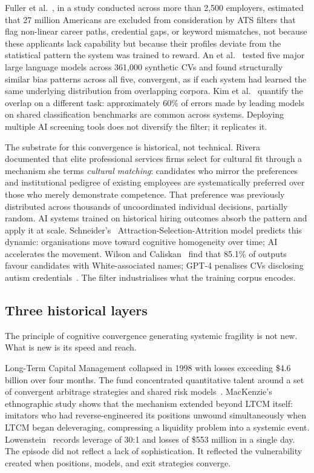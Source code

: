 \documentclass[11pt,a4paper]{article}
\begin{document}
Fuller et al.~\cite{fuller_hbs_2021}, in a study conducted across more than
2,500 employers, estimated that 27 million Americans are excluded from
consideration by ATS filters that flag non-linear career paths, credential
gaps, or keyword mismatches, not because these applicants lack capability
but because their profiles deviate from the statistical pattern the system
was trained to reward. An et al.~\cite{an_pnasnexus_2025} tested five major
large language models across 361,000 synthetic CVs and found structurally
similar bias patterns across all five, convergent, as if each system had
learned the same underlying distribution from overlapping corpora. Kim et
al.~\cite{kim_icml_2025} quantify the overlap on a different task:
approximately 60\% of errors made by leading models on shared classification
benchmarks are common across systems. Deploying multiple AI screening tools
does not diversify the filter; it replicates it.

The substrate for this convergence is historical, not technical.
Rivera~\cite{rivera_asr_2012} documented that elite professional services
firms select for cultural fit through a mechanism she terms \textit{cultural
matching}: candidates who mirror the preferences and institutional pedigree
of existing employees are systematically preferred over those who merely
demonstrate competence. That preference was previously distributed across
thousands of uncoordinated individual decisions, partially random. AI
systems trained on historical hiring outcomes absorb the pattern and apply it
at scale. Schneider's~\cite{schneider_pp_1987} Attraction-Selection-Attrition
model predicts this dynamic: organisations move toward cognitive homogeneity
over time; AI accelerates the movement. Wilson and
Caliskan~\cite{wilson_aies_2024} find that 85.1\% of outputs favour
candidates with White-associated names; GPT-4 penalises CVs disclosing autism
credentials~\cite{glazko_facct_2024}. The filter industrialises what the
training corpus encodes.

\subsection{Three historical layers}

The principle of cognitive convergence generating systemic fragility is not
new. What is new is its speed and reach.

Long-Term Capital Management collapsed in 1998 with losses exceeding \$4.6
billion over four months. The fund concentrated quantitative talent around a
set of convergent arbitrage strategies and shared risk
models~\cite{jorion_efm_2000,mackenzie_econsoc_2003}. MacKenzie's
ethnographic study shows that the mechanism extended beyond LTCM itself:
imitators who had reverse-engineered its positions unwound simultaneously
when LTCM began deleveraging, compressing a liquidity problem into a systemic
event. Lowenstein~\cite{lowenstein_book_2000} records leverage of 30:1 and
losses of \$553 million in a single day. The episode did not reflect a lack
of sophistication. It reflected the vulnerability created when positions,
models, and exit strategies converge.
\end{document}
